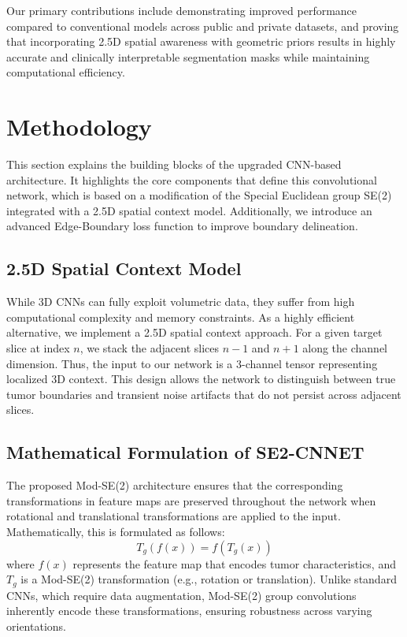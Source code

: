 \documentclass[10pt,twocolumn,letterpaper]{article}
\begin{document}
Our primary contributions include demonstrating improved performance compared to conventional models across public and private datasets, and proving that incorporating 2.5D spatial awareness with geometric priors results in highly accurate and clinically interpretable segmentation masks while maintaining computational efficiency.

\section{Methodology}
This section explains the building blocks of the upgraded CNN-based architecture. It highlights the core components that define this convolutional network, which is based on a modification of the Special Euclidean group SE(2) integrated with a 2.5D spatial context model. Additionally, we introduce an advanced Edge-Boundary loss function to improve boundary delineation.

\subsection{2.5D Spatial Context Model}
While 3D CNNs can fully exploit volumetric data, they suffer from high computational complexity and memory constraints. As a highly efficient alternative, we implement a 2.5D spatial context approach. For a given target slice at index $n$, we stack the adjacent slices $n-1$ and $n+1$ along the channel dimension. Thus, the input to our network is a 3-channel tensor representing localized 3D context. This design allows the network to distinguish between true tumor boundaries and transient noise artifacts that do not persist across adjacent slices.

\subsection{Mathematical Formulation of SE2-CNNET}
The proposed Mod-SE(2) architecture ensures that the corresponding transformations in feature maps are preserved throughout the network when rotational and translational transformations are applied to the input. Mathematically, this is formulated as follows:
\begin{equation}
    T_g(f(x)) = f(T_g(x))
\end{equation}
where $f(x)$ represents the feature map that encodes tumor characteristics, and $T_g$ is a Mod-SE(2) transformation (e.g., rotation or translation). Unlike standard CNNs, which require data augmentation, Mod-SE(2) group convolutions inherently encode these transformations, ensuring robustness across varying orientations.
\end{document}

